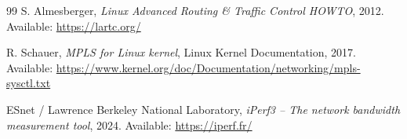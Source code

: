 \begin{thebibliography}{99}
S. Almesberger,
\textit{Linux Advanced Routing \& Traffic Control HOWTO},
2012.
Available: \url{https://lartc.org/}

R. Schauer,
\textit{MPLS for Linux kernel},
Linux Kernel Documentation, 2017.
Available: \url{https://www.kernel.org/doc/Documentation/networking/mpls-sysctl.txt}

ESnet / Lawrence Berkeley National Laboratory,
\textit{iPerf3 -- The network bandwidth measurement tool},
2024.
Available: \url{https://iperf.fr/}

\end{thebibliography}